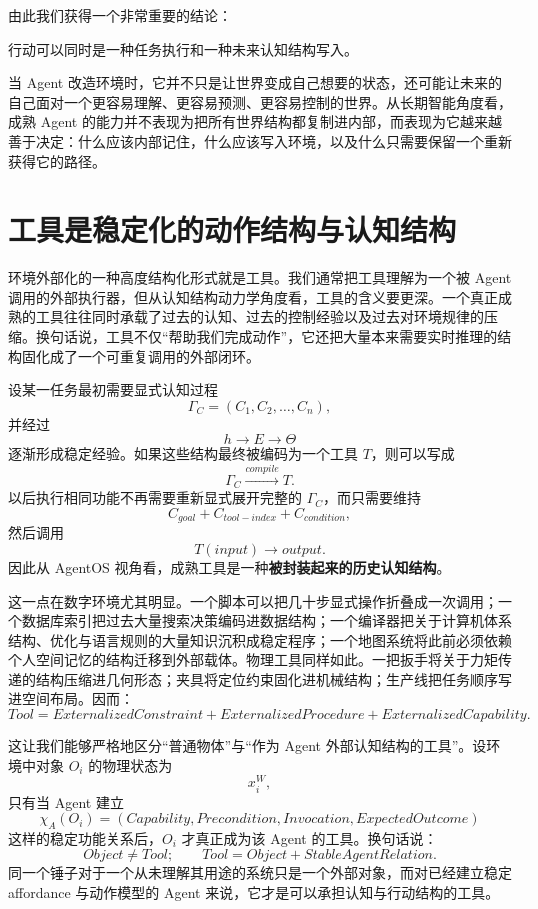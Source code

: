 由此我们获得一个非常重要的结论：
\begin{conclusion}
行动可以同时是一种任务执行和一种未来认知结构写入。
\end{conclusion}
当 Agent 改造环境时，它并不只是让世界变成自己想要的状态，还可能让未来的自己面对一个更容易理解、更容易预测、更容易控制的世界。从长期智能角度看，成熟 Agent 的能力并不表现为把所有世界结构都复制进内部，而表现为它越来越善于决定：什么应该内部记住，什么应该写入环境，以及什么只需要保留一个重新获得它的路径。

\section{工具是稳定化的动作结构与认知结构}

环境外部化的一种高度结构化形式就是工具。我们通常把工具理解为一个被 Agent 调用的外部执行器，但从认知结构动力学角度看，工具的含义要更深。一个真正成熟的工具往往同时承载了过去的认知、过去的控制经验以及过去对环境规律的压缩。换句话说，工具不仅``帮助我们完成动作''，它还把大量本来需要实时推理的结构固化成了一个可重复调用的外部闭环。

设某一任务最初需要显式认知过程
\[
\Gamma_C
=
(C_1,C_2,\ldots,C_n),
\]
并经过
\[
h
\rightarrow
E
\rightarrow
\Theta
\]
逐渐形成稳定经验。如果这些结构最终被编码为一个工具 $T$，则可以写成
\[
\Gamma_C
\xrightarrow{compile}
T.
\]
以后执行相同功能不再需要重新显式展开完整的 $\Gamma_C$，而只需要维持
\[
C_{goal}
+
C_{tool-index}
+
C_{condition},
\]
然后调用
\[
T(input)\rightarrow output.
\]
因此从 AgentOS 视角看，成熟工具是一种\textbf{被封装起来的历史认知结构}。

这一点在数字环境尤其明显。一个脚本可以把几十步显式操作折叠成一次调用；一个数据库索引把过去大量搜索决策编码进数据结构；一个编译器把关于计算机体系结构、优化与语言规则的大量知识沉积成稳定程序；一个地图系统将此前必须依赖个人空间记忆的结构迁移到外部载体。物理工具同样如此。一把扳手将关于力矩传递的结构压缩进几何形态；夹具将定位约束固化进机械结构；生产线把任务顺序写进空间布局。因而：
\[
\boxed{
Tool
=
ExternalizedConstraint
+
ExternalizedProcedure
+
ExternalizedCapability.
}
\]

这让我们能够严格地区分``普通物体''与``作为 Agent 外部认知结构的工具''。设环境中对象 $O_i$ 的物理状态为
\[
x_i^W,
\]
只有当 Agent 建立
\[
\chi_A(O_i)
=
(
Capability,
Precondition,
Invocation,
ExpectedOutcome
)
\]
这样的稳定功能关系后，$O_i$ 才真正成为该 Agent 的工具。换句话说：
\[
\boxed{
Object\neq Tool;
\qquad
Tool=Object+StableAgentRelation.
}
\]
同一个锤子对于一个从未理解其用途的系统只是一个外部对象，而对已经建立稳定 affordance 与动作模型的 Agent 来说，它才是可以承担认知与行动结构的工具。

